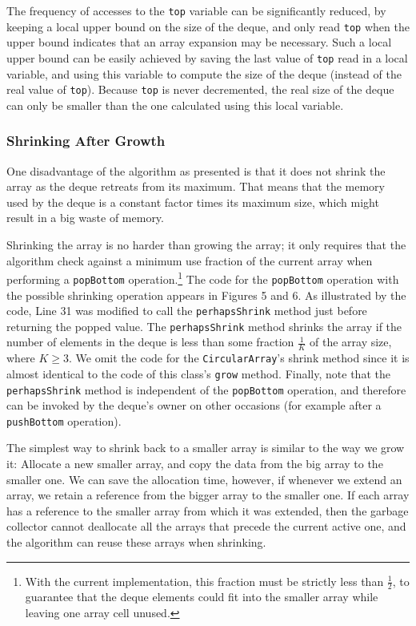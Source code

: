 The frequency of accesses to the \lstinline!top! variable can be
significantly reduced, by keeping a local upper bound on the size of
the deque, and only read \lstinline!top! when the upper bound
indicates that an array expansion may be necessary. Such a local upper
bound can be easily achieved by saving the last value of
\lstinline!top! read in a local variable, and using this variable to
compute the size of the deque (instead of the real value of
\lstinline!top!). Because \lstinline!top! is never decremented, the
real size of the deque can only be smaller than the one calculated
using this local variable.

\subsubsection{Shrinking After Growth}

One disadvantage of the algorithm as presented is that it does not
shrink the array as the deque retreats from its maximum. That means
that the memory used by the deque is a constant factor times its
maximum size, which might result in a big waste of memory.

Shrinking the array is no harder than growing the array; it only
requires that the algorithm check against a minimum use fraction of
the current array when performing a \lstinline!popBottom!
operation.\footnote{With the current implementation, this fraction
  must be strictly less than $\frac{1}{2}$, to guarantee that the
  deque elements could fit into the smaller array while leaving one
  array cell unused.} The code for the \lstinline!popBottom!
operation with the possible shrinking operation appears in Figures 5
and 6. As illustrated by the code, Line 31 was modified to call the
\lstinline!perhapsShrink! method just before returning the popped
value. The \lstinline!perhapsShrink! method shrinks the array if the
number of elements in the deque is less than some fraction
$\frac{1}{K}$ of the array size, where $K \ge 3$. We omit the code for
the \lstinline!CircularArray!'s shrink method since it is almost
identical to the code of this class's \lstinline!grow! method.
Finally, note that the \lstinline!perhapsShrink! method is independent
of the \lstinline!popBottom! operation, and therefore can be invoked
by the deque's owner on other occasions (for example after a
\lstinline!pushBottom! operation).


The simplest way to shrink back to a smaller array is similar to the
way we grow it: Allocate a new smaller array, and copy the data from
the big array to the smaller one. We can save the allocation time,
however, if whenever we extend an array, we retain a reference from
the bigger array to the smaller one. If each array has a reference to
the smaller array from which it was extended, then the garbage
collector cannot deallocate all the arrays that precede the current
active one, and the algorithm can reuse these arrays when shrinking.

